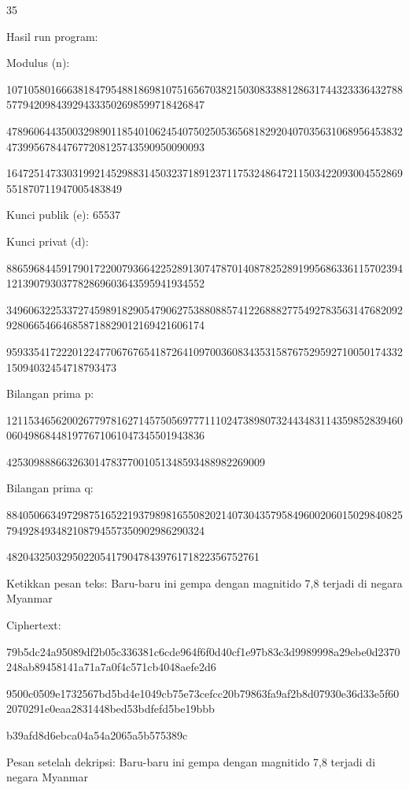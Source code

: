 \documentclass{article}
\begin{document}

35

Hasil run program:

Modulus (n): 

107105801666381847954881869810751656703821503083388128631744323336432788577942098439294333502698599718426847

478960644350032989011854010624540750250536568182920407035631068956453832473995678447677208125743590950090093

164725147330319921452988314503237189123711753248647211503422093004552869551870711947005483849

Kunci publik (e): 65537

Kunci privat (d): 

886596844591790172200793664225289130747870140878252891995686336115702394121390793037782869603643595941934552

349606322533727459891829054790627538808857412268882775492783563147682092928066546646858718829012169421606174

95933541722201224770676765418726410970036083435315876752959271005017433215094032454718793473

Bilangan prima p: 

121153465620026779781627145750569777111024738980732443483114359852839460060498684481977671061047345501943836

42530988866326301478377001051348593488982269009

Bilangan prima q: 

884050663497298751652219379898165508202140730435795849600206015029840825794928493482108794557350902986290324

4820432503295022054179047843976171822356752761

Ketikkan pesan teks:  Baru-baru ini gempa dengan magnitido 7,8 terjadi di negara Myanmar

Ciphertext: 

79b5dc24a95089df2b05c336381c6cde964f6f0d40cf1e97b83c3d9989998a29ebe0d2370248ab89458141a71a7a0f4c571cb4048aefe2d6

9500c0509e1732567bd5bd4e1049cb75e73cefcc20b79863fa9af2b8d07930e36d33e5f602070291e0eaa2831448bed53bdfefd5be19bbb

b39afd8d6ebca04a54a2065a5b575389c

Pesan setelah dekripsi: Baru-baru ini gempa dengan magnitido 7,8 terjadi di negara Myanmar
\end{document}
